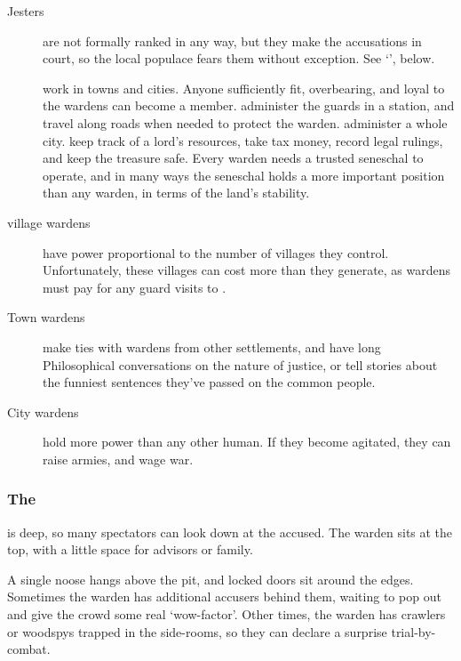 \begin{multicols}{2}
\begin{description}
  \item[Jesters]
  are not formally ranked in any way, but they make the accusations in court, so the local populace fears them without exception.
  See `', below.
  \item[]
  work in towns and cities.
  Anyone sufficiently fit, overbearing, and loyal to the \glspl{warden} can become a member.
  administer the guards in a station, and travel along roads when needed to protect the \gls{warden}.
  administer a whole city.
  keep track of a lord's resources, take tax money, record legal rulings, and keep the treasure safe.
  Every \gls{warden} needs a trusted seneschal to operate, and in many ways the seneschal holds a more important position than any \gls{warden}, in terms of the land's stability.
  \item[\Gls{village} \Glspl{warden}]
  have power proportional to the number of \glspl{village} they control.
  Unfortunately, these \glspl{village} can cost more than they generate, as \glspl{warden} must pay for any \gls{guard} visits to .
  \item[Town \Glspl{warden}]
  make ties with \glspl{warden} from other settlements, and have long Philosophical conversations on the nature of justice, or tell stories about the funniest sentences they've passed on the common people.
  \item[City \Glspl{warden}]
  hold more power than any other human.
  If they become agitated, they can raise armies, and wage war.
\end{description}


\subsubsection{The }
\label{pitOfJustice}
is deep, so many spectators can look down at the accused.
The \gls{warden} sits at the top, with a little space for advisors or family.

A single noose hangs above the pit, and locked doors sit around the edges.
Sometimes the \gls{warden} has additional accusers behind them, waiting to pop out and give the crowd some real `wow-factor'.
Other times, the \gls{warden} has \glspl{crawler} or \glspl{woodspy} trapped in the side-rooms, so they can declare a surprise trial-by-combat.


\end{multicols}
